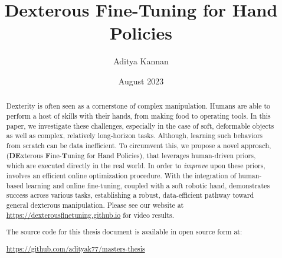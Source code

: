 \documentclass[12pt]{cmuthesis}
\begin{document}
\frontmatter

\pagestyle{empty}

\title{{\bf Dexterous Fine-Tuning for Hand Policies}}
\author{Aditya Kannan}
\date{August 2023}


\support{}
\disclaimer{}


\maketitle

\begin{abstract}
  Dexterity is often seen as a cornerstone of complex manipulation. Humans are able to perform a host of  skills with their hands, from making food to operating tools. In this paper, we investigate these challenges, especially in the case of soft, deformable objects as well as complex, relatively long-horizon tasks. Although, learning such behaviors from scratch can be data inefficient. To circumvent this, we propose a novel approach,  \ours (\textbf{DE}xterous \textbf{F}ine-\textbf{T}uning for Hand Policies), that leverages human-driven priors, which are executed directly in the real world. In order to \textit{improve} upon these priors, \ours involves an efficient online optimization procedure. With the integration of human-based learning and online fine-tuning, coupled with a soft robotic hand, \ours demonstrates success across various tasks, establishing a robust, data-efficient pathway toward general dexterous manipulation.  Please see our website at \url{https://dexterousfinetuning.github.io} for video results. 
  
  \noindent
  The source code for this thesis document is available in open source form at:
  \begin{center}
  \url{https://github.com/adityak77/masters-thesis}
  \end{center}
\end{abstract}
\end{document}
